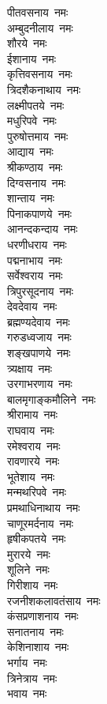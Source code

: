 \begin{multicols}{2}
\begin{flushleft}
पीतवसनाय~नमः\\
अम्बुदनीलाय~नमः\\
शौरये~नमः\\
ईशानाय~नमः\\
कृत्तिवसनाय~नमः\\
त्रिदशैकनाथाय~नमः\\
लक्ष्मीपतये~नमः\\
मधुरिपवे~नमः\hfill{}\\
पुरुषोत्तमाय~नमः\\
आद्याय~नमः\\
श्रीकण्ठाय~नमः\\
दिग्वसनाय~नमः\\
शान्ताय~नमः\\
पिनाकपाणये~नमः\\
आनन्दकन्दाय~नमः\\
धरणीधराय~नमः\\
पद्मनाभाय~नमः\\
सर्वेश्वराय~नमः\hfill{}\\
त्रिपुरसूदनाय~नमः\\
देवदेवाय~नमः\\
ब्रह्मण्यदेवाय~नमः\\
गरुडध्वजाय~नमः\\
शङ्खपाणये~नमः\\
त्र्यक्षाय~नमः\\
उरगाभरणाय~नमः\\
बालमृगाङ्कमौलिने~नमः\\
श्रीरामाय~नमः\\
राघवाय~नमः\hfill{}\\
रमेश्वराय~नमः\\
रावणारये~नमः\\
भूतेशाय~नमः\\
मन्मथरिपवे~नमः\\
प्रमथाधिनाथाय~नमः\\
चाणूरमर्दनाय~नमः\\
हृषीकपतये~नमः\\
मुरारये~नमः\\
शूलिने~नमः\\
गिरीशाय~नमः\hfill{}\\
रजनीशकलावतंसाय~नमः\\
कंसप्रणाशनाय~नमः\\
सनातनाय~नमः\\
केशिनाशाय~नमः\\
भर्गाय~नमः\\
त्रिनेत्राय~नमः\\
भवाय~नमः\\

\end{flushleft}
\end{multicols}
